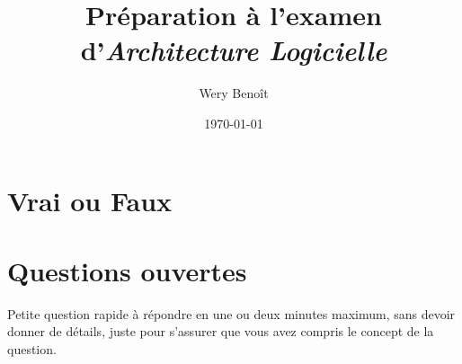 


\newcommand{\vf}[3]{\textcolor{dkblue}{\textit{#1}}\hspace*{.2cm}#2\vspace*{.2cm}\par\hspace*{.5cm}#3}
\newcommand{\qouv}[2]{\textcolor{dkblue}{\textit{#1}}\vspace*{.2cm}\par\hspace*{.5cm}#2}

\newcommand{\vrai}[0]{\textcolor{dkgreen}{Vrai}}
\newcommand{\faux}[0]{\textcolor{dkred}{Faux}}

\title{Préparation à l'examen d'\textit{Architecture Logicielle}}
\author{Wery Benoît}
\date{\today}


\maketitle
\chapter{Vrai ou Faux}
\begin{enumerate}\setlength\itemsep{1em}




\end{enumerate}



\chapter{Questions ouvertes}
Petite question rapide à répondre en une ou deux minutes maximum, sans devoir donner de détails,
juste pour s’assurer que vous avez compris le concept de la question.
\paragraph{}
\begin{enumerate}\setlength\itemsep{1em}



\end{enumerate}


